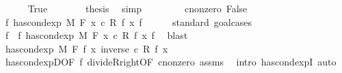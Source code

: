 \begin{isabellebody}
\ \ \ \ \isamarkupfalse%
\ True\isanewline
\ \ \ \ \isamarkupfalse%
\ \isamarkupfalse%
\ {\isacharquery}{\kern0pt}thesis\ \isamarkupfalse%
\ simp\isanewline
\ \ \isamarkupfalse%
\isanewline
\ \ \ \ \isamarkupfalse%
\ c{\isacharunderscore}{\kern0pt}nonzero{\isacharcolon}{\kern0pt}\ False\isanewline
\ \ \ \ \isamarkupfalse%
\ {\isachardoublequoteopen}{\isasymnexists}f{\isacharprime}{\kern0pt}{\isachardot}{\kern0pt}\ has{\isacharunderscore}{\kern0pt}cond{\isacharunderscore}{\kern0pt}exp\ M\ F\ {\isacharparenleft}{\kern0pt}{\isasymlambda}x{\isachardot}{\kern0pt}\ c\ {\isacharasterisk}{\kern0pt}\isactrlsub R\ f\ x{\isacharparenright}{\kern0pt}\ f{\isacharprime}{\kern0pt}{\isachardoublequoteclose}\isanewline
\ \ \ \ \isamarkupfalse%
\ {\isacharparenleft}{\kern0pt}standard{\isacharcomma}{\kern0pt}\ goal{\isacharunderscore}{\kern0pt}cases{\isacharparenright}{\kern0pt}\isanewline
\ \ \ \ \ \ \isamarkupfalse%
\ {}\isanewline
\ \ \ \ \ \ \isamarkupfalse%
\ \isamarkupfalse%
\ f{\isacharprime}{\kern0pt}\ \ f{\isacharprime}{\kern0pt}{\isacharcolon}{\kern0pt}\ {\isachardoublequoteopen}has{\isacharunderscore}{\kern0pt}cond{\isacharunderscore}{\kern0pt}exp\ M\ F\ {\isacharparenleft}{\kern0pt}{\isasymlambda}x{\isachardot}{\kern0pt}\ c\ {\isacharasterisk}{\kern0pt}\isactrlsub R\ f\ x{\isacharparenright}{\kern0pt}\ f{\isacharprime}{\kern0pt}{\isachardoublequoteclose}\ \isamarkupfalse%
\ blast\isanewline
\ \ \ \ \ \ \isamarkupfalse%
\ {\isachardoublequoteopen}has{\isacharunderscore}{\kern0pt}cond{\isacharunderscore}{\kern0pt}exp\ M\ F\ f\ {\isacharparenleft}{\kern0pt}{\isasymlambda}x{\isachardot}{\kern0pt}\ inverse\ c\ {\isacharasterisk}{\kern0pt}\isactrlsub R\ f{\isacharprime}{\kern0pt}\ x{\isacharparenright}{\kern0pt}{\isachardoublequoteclose}\ \isamarkupfalse%
\ has{\isacharunderscore}{\kern0pt}cond{\isacharunderscore}{\kern0pt}expD{\isacharbrackleft}{\kern0pt}OF\ f{\isacharprime}{\kern0pt}{\isacharbrackright}{\kern0pt}\ divideR{\isacharunderscore}{\kern0pt}right{\isacharbrackleft}{\kern0pt}OF\ c{\isacharunderscore}{\kern0pt}nonzero{\isacharbrackright}{\kern0pt}\ assms\ \isamarkupfalse%
\ {\isacharparenleft}{\kern0pt}intro\ has{\isacharunderscore}{\kern0pt}cond{\isacharunderscore}{\kern0pt}expI{\isacharprime}{\kern0pt}{\isacharcomma}{\kern0pt}\ auto{\isacharparenright}{\kern0pt}\isanewline
\ \ \ \ \ \ \isamarkupfalse%

\end{isabellebody}
